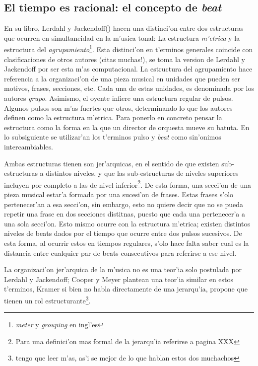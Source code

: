 \subsection{El tiempo es racional: el concepto de \emph{beat}}
\newline
En su libro, Lerdahl y Jackendoff(\cite{LerdahlJackendoff83}) hacen una distinci'on entre dos estructuras que ocurren en simultaneidad en la m'usica tonal:
La estructura \emph{m'etrica} y la estructura del \emph{agrupamiento}\footnote{\emph{meter} y \emph{grouping} en ingl'es}. 
Esta distinci'on en t'erminos generales coincide con clasificaciones de otros autores (\alert{citas muchas!}), se toma la version de Lerdahl y Jackendoff 
por ser esta m'as computacional.
La estructura del agrupamiento hace referencia a la organizaci'on de una pieza musical en unidades que pueden ser motivos, frases, secciones, etc. 
Cada una de estas unidades, es denominada por los autores \emph{grupo}. Asimismo, el oyente infiere una estructura regular de pulsos. 
Algunos pulsos son m'as fuertes que otros, determinando lo que los autores definen como la estructura m'etrica. 
Para ponerlo en concreto pensar la estructura como la forma en la que un director de orquesta mueve su batuta. 
En lo subsiguiente se utilizar'an los t'erminos pulso y \emph{beat} como sin'onimos intercambiables.

Ambas estructuras tienen son jer'arquicas, en el sentido de que existen sub-estructuras a distintos niveles, y que las sub-estructuras de niveles superiores 
incluyen por completo a las de nivel inferior\footnote{Para una definici'on mas formal de la jerarqu'ia referirse a \cite{LerdahlJackendoff83} pagina \alert{XXX}}. De esta forma, una secci'on
de una pieza musical estar'a formada por una sucesi'on de frases. Estas frases s'olo pertenecer'an a esa secci'on, sin embargo, esto no quiere decir
que no se pueda repetir una frase en dos secciones distitnas, puesto que cada una pertenecer'a a una sola secci'on. 
Esto mismo ocurre con la estructura m'etrica; existen distintos niveles de beats dados por el tiempo que ocurre entre dos pulsos sucesivos. De esta forma, al 
ocurrir estos en tiempos regulares, s'olo hace falta saber cual es la distancia entre cualquier par de beats consecutivos para referirse a ese nivel. 

La organizaci'on jer'arquica de la m'usica no es una teor'ia solo postulada por Lerdahl y Jackendoff; Cooper y Meyer\cite{CooperMeyer60} plantean una teor'ia similar en
estos t'erminos, Kramer\cite{Kramer88} si bien no habla directamente de una jerarqu'ia, propone que tienen un rol 
estructurante\footnote{\alert{tengo que leer m'as, as'i se mejor de lo que hablan estos dos muchachos}}. 


